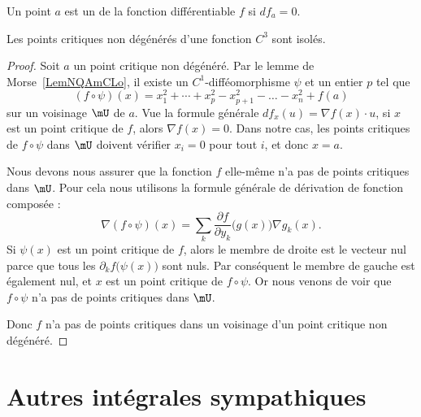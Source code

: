 \begin{definition}
	Un point \( a\) est un  de la fonction différentiable \( f\) si \( df_a=0\).
\end{definition}

\begin{corollary}
	Les points critiques non dégénérés d'une fonction \( C^3\) sont isolés.
\end{corollary}

\begin{proof}
	Soit \( a\) un point critique non dégénéré. Par le lemme de Morse~\ref{LemNQAmCLo}, il existe un \( C^1\)-difféomorphisme \( \psi\) et un entier \( p\) tel que
	\begin{equation}
		(f\circ \psi)(x)=x_1^2+\cdots +x_p^2-x_{p+1}^2-\ldots -x_n^2+f(a)
	\end{equation}
	sur un voisinage \( \mU\) de \( a\). Vue la formule générale \( df_x(u)=\nabla f(x)\cdot u\), si \( x\) est un point critique de \( f\), alors \( \nabla f(x)=0\). Dans notre cas, les points critiques de \( f\circ \psi\) dans \( \mU\) doivent vérifier \( x_i=0\) pour tout \( i\), et donc \( x=a\).

	Nous devons nous assurer que la fonction \( f\) elle-même n'a pas de points critiques dans \( \mU\). Pour cela nous utilisons la formule générale de dérivation de fonction composée :
	\begin{equation}
		\nabla(f\circ\psi)(x)=\sum_k \frac{ \partial f }{ \partial y_k }\big( g(x) \big)\nabla g_k(x).
	\end{equation}
	Si \( \psi(x)\) est un point critique de \( f\), alors le membre de droite est le vecteur nul parce que tous les \( \partial_kf\big( \psi(x) \big)\) sont nuls. Par conséquent le membre de gauche est également nul, et \( x\) est un point critique de \( f\circ\psi\). Or nous venons de voir que \( f\circ\psi\) n'a pas de points critiques dans \( \mU\).

	Donc \( f\) n'a pas de points critiques dans un voisinage d'un point critique non dégénéré.
\end{proof}


\section{Autres intégrales sympathiques}

